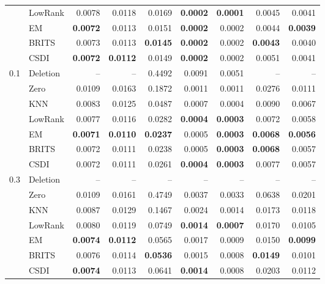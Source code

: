 {\begin{tabular}{@{}llrrrrrrr@{}}
 & LowRank & 0.0078 & 0.0118 & 0.0169 & \textbf{0.0002} & \textbf{0.0001} & 0.0045 & 0.0041 \\
 & EM & \textbf{0.0072} & 0.0113 & 0.0151 & \textbf{0.0002} & 0.0002 & 0.0044 & \textbf{0.0039} \\
 & BRITS & 0.0073 & 0.0113 & \textbf{0.0145} & \textbf{0.0002} & 0.0002 & \textbf{0.0043} & 0.0040 \\
 & CSDI & \textbf{0.0072} & \textbf{0.0112} & 0.0149 & \textbf{0.0002} & 0.0002 & 0.0051 & 0.0041 \\
\midrule
0.1 & Deletion & -- & -- & 0.4492 & 0.0091 & 0.0051 & -- & -- \\
 & Zero & 0.0109 & 0.0163 & 0.1872 & 0.0011 & 0.0011 & 0.0276 & 0.0111 \\
 & KNN & 0.0083 & 0.0125 & 0.0487 & 0.0007 & 0.0004 & 0.0090 & 0.0067 \\
 & LowRank & 0.0077 & 0.0116 & 0.0282 & \textbf{0.0004} & \textbf{0.0003} & 0.0072 & 0.0058 \\
 & EM & \textbf{0.0071} & \textbf{0.0110} & \textbf{0.0237} & 0.0005 & \textbf{0.0003} & \textbf{0.0068} & \textbf{0.0056} \\
 & BRITS & 0.0072 & 0.0111 & 0.0238 & 0.0005 & \textbf{0.0003} & \textbf{0.0068} & 0.0057 \\
 & CSDI & 0.0072 & 0.0111 & 0.0261 & \textbf{0.0004} & \textbf{0.0003} & 0.0077 & 0.0057 \\
\midrule
0.3 & Deletion & -- & -- & -- & -- & -- & -- & -- \\
 & Zero & 0.0109 & 0.0161 & 0.4749 & 0.0037 & 0.0033 & 0.0638 & 0.0201 \\
 & KNN & 0.0087 & 0.0129 & 0.1467 & 0.0024 & 0.0014 & 0.0173 & 0.0118 \\
 & LowRank & 0.0080 & 0.0119 & 0.0749 & \textbf{0.0014} & \textbf{0.0007} & 0.0170 & 0.0105 \\
 & EM & \textbf{0.0074} & \textbf{0.0112} & 0.0565 & 0.0017 & 0.0009 & 0.0150 & \textbf{0.0099} \\
 & BRITS & 0.0076 & 0.0114 & \textbf{0.0536} & 0.0015 & 0.0008 & \textbf{0.0149} & 0.0101 \\
 & CSDI & \textbf{0.0074} & 0.0113 & 0.0641 & \textbf{0.0014} & 0.0008 & 0.0203 & 0.0112 \\
\bottomrule
\end{tabular}}
